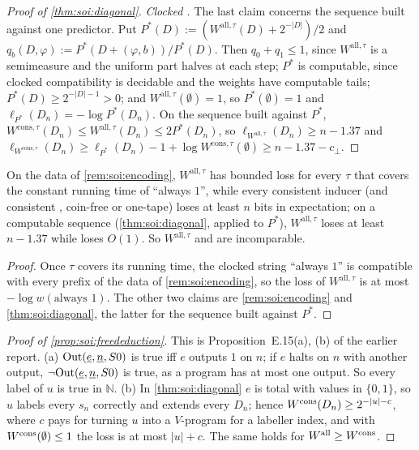 \begin{proof}[Proof of \cref{thm:soi:diagonal}]
\emph{Clocked \SOIabbr.} The last claim concerns the sequence built against one predictor. Put $P^\ast(D):=(W^{\mathrm{all},\tau}(D)+2^{-\lvert D\rvert})/2$ and $q_b(D,\varphi):=P^\ast(D+(\varphi,b))/P^\ast(D)$. Then $q_0+q_1\le1$, since $W^{\mathrm{all},\tau}$ is a semimeasure and the uniform part halves at each step; $P^\ast$ is computable, since clocked compatibility is decidable and the weights have computable tails; $P^\ast(D)\ge2^{-\lvert D\rvert-1}>0$; and $W^{\mathrm{all},\tau}(\emptyset)=1$, so $P^\ast(\emptyset)=1$ and $\ell_{P^\ast}(D_n)=-\log P^\ast(D_n)$. On the sequence built against $P^\ast$, $W^{\mathrm{cons},\tau}(D_n)\le W^{\mathrm{all},\tau}(D_n)\le2P^\ast(D_n)$, so $\ell_{W^{\mathrm{all},\tau}}(D_n)\ge n-1.37$ and $\ell_{W^{\mathrm{cons},\tau}}(D_n)\ge\ell_{P^\ast}(D_n)-1+\log W^{\mathrm{cons},\tau}(\emptyset)\ge n-1.37-c_\bot$.
\end{proof}

\begin{proposition}\label{prop:soi:incomparable}
On the data of \cref{rem:soi:encoding}, $W^{\mathrm{all},\tau}$ has bounded loss for every $\tau$ that covers the constant running time of ``always $1$'', while every consistent inducer (\SAIabbr and consistent \SOIabbr, coin-free or one-tape) loses at least $n$ bits in expectation; on a computable sequence (\cref{thm:soi:diagonal}, applied to $P^\ast$), $W^{\mathrm{all},\tau}$ loses at least $n-1.37$ while \SAIabbr loses $O(1)$. So $W^{\mathrm{all},\tau}$ and \SAIabbr are incomparable.
\end{proposition}

\begin{proof}
Once $\tau$ covers its running time, the clocked string ``always $1$'' is compatible with every prefix of the data of \cref{rem:soi:encoding}, so the loss of $W^{\mathrm{all},\tau}$ is at most $-\log w(\text{always }1)$. The other two claims are \cref{rem:soi:encoding} and \cref{thm:soi:diagonal}, the latter for the sequence built against $P^\ast$.
\end{proof}

\begin{proof}[Proof of \cref{prop:soi:freededuction}]
This is Proposition~E.15(a), (b) of the earlier report. (a) $\mathrm{Out}(\underline{e},\underline{n},S0)$ is true iff $e$ outputs $1$ on $n$; if $e$ halts on $n$ with another output, $\neg\mathrm{Out}(\underline{e},\underline{n},S0)$ is true, as a program has at most one output. So every label of $u$ is true in $\mathbb N$. (b) In \cref{thm:soi:diagonal} $e$ is total with values in $\{0,1\}$, so $u$ labels every $s_n$ correctly and extends every $D_n$; hence $W^{\mathrm{cons}}(D_n)\ge2^{-\lvert u\rvert-c}$, where $c$ pays for turning $u$ into a $V$-program for a labeller index, and with $W^{\mathrm{cons}}(\emptyset)\le1$ the loss is at most $\lvert u\rvert+c$. The same holds for $W^{\mathrm{all}}\ge W^{\mathrm{cons}}$.
\end{proof}

